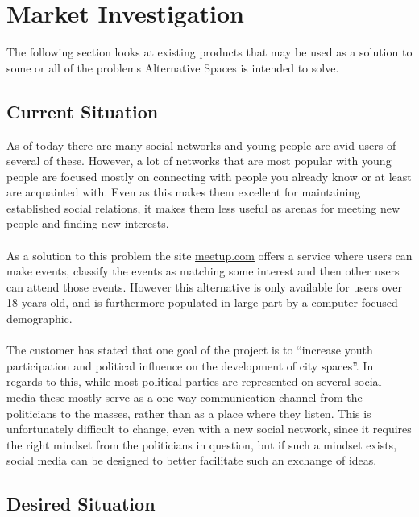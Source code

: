 \section{Market Investigation}
\label{sec:PrelimMarket}

The following section looks at existing products that may be used as a solution to some or all of the problems Alternative Spaces is intended to solve.

\subsection{Current Situation}
\label{subsec:PrelimMarketSituation}
As of today there are many social networks and young people are avid users of several of these. However, a lot of networks that are most popular with young people are focused mostly on connecting with people you already know or at least are acquainted with. Even as this makes them excellent for maintaining established social relations, it makes them less useful as arenas for meeting new people and finding new interests.

\paragraph{} As a solution to this problem the site \href{http://www.meetup.com}{meetup.com} offers a service where users can make events, classify the events as matching some interest and then other users can attend those events. However this alternative is only available for users over 18 years old, and is furthermore populated in large part by a computer focused demographic.

\paragraph{} The customer has stated that one goal of the project is to “increase youth participation and political influence on the development of city spaces”. In regards to this, while most political parties are represented on several social media these mostly serve as a one-way communication channel from the politicians to the masses, rather than as a place where they listen. This is unfortunately difficult to change, even with a new social network, since it requires the right mindset from the politicians in question, but if such a mindset exists, social media can be designed to better facilitate such an exchange of ideas.

\subsection{Desired Situation}
\label{subsec:PrelimMarketDesired}


